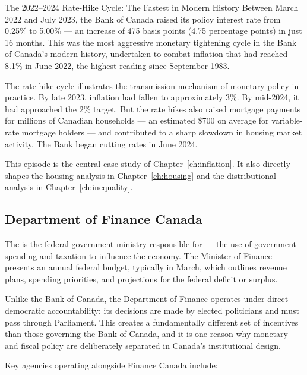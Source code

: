 \begin{canexample}{The 2022--2024 Rate-Hike Cycle: The Fastest in Modern History}
Between March 2022 and July 2023, the Bank of Canada raised its policy
interest rate from 0.25\% to 5.00\% --- an increase of 475 basis points
(4.75 percentage points) in just 16 months. This was the most aggressive
monetary tightening cycle in the Bank of Canada's modern history, undertaken
to combat inflation that had reached 8.1\% in June 2022, the highest reading
since September 1983.

The rate hike cycle illustrates the transmission mechanism of monetary policy
in practice. By late 2023, inflation had fallen to approximately 3\%. By mid-2024,
it had approached the 2\% target. But the rate hikes also raised mortgage
payments for millions of Canadian households --- an estimated \$700 on average
for variable-rate mortgage holders --- and contributed to a sharp slowdown in
housing market activity. The Bank began cutting rates in June 2024.

This episode is the central case study of Chapter~\ref{ch:inflation}. It also
directly shapes the housing analysis in Chapter~\ref{ch:housing} and the
distributional analysis in Chapter~\ref{ch:inequality}.
\end{canexample}

\subsection{Department of Finance Canada}

The  is the federal government ministry
responsible for  --- the use of government spending and
taxation to influence the economy. The Minister of Finance presents an
annual federal budget, typically in March, which outlines revenue plans,
spending priorities, and projections for the federal deficit or surplus.

Unlike the Bank of Canada, the Department of Finance operates under direct
democratic accountability: its decisions are made by elected politicians and
must pass through Parliament. This creates a fundamentally different set of
incentives than those governing the Bank of Canada, and it is one reason why
monetary and fiscal policy are deliberately separated in Canada's institutional
design.

Key agencies operating alongside Finance Canada include:

